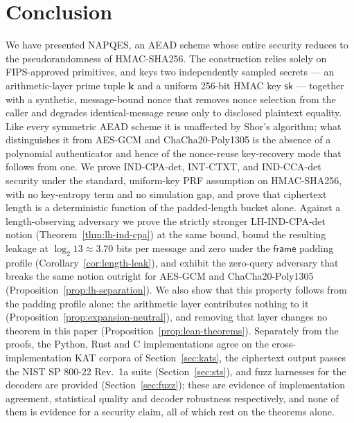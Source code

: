 \documentclass[11pt,a4paper]{article}
\begin{document}
\section{Conclusion}
\label{sec:conclusion}

We have presented NAPQES, an AEAD scheme whose entire security reduces to
the pseudorandomness of HMAC-SHA256. The construction relies solely on
FIPS-approved primitives, and keys two independently sampled secrets — an
arithmetic-layer prime tuple $\mathbf{k}$ and a uniform 256-bit HMAC key
$\mathsf{sk}$ — together with a synthetic, message-bound nonce that removes
nonce selection from the caller and degrades identical-message reuse only
to disclosed plaintext equality. Like every symmetric AEAD scheme it is
unaffected by Shor's algorithm; what distinguishes it from AES-GCM and
ChaCha20-Poly1305 is the absence of a polynomial authenticator and hence of
the nonce-reuse key-recovery mode that follows from one. We prove
IND-CPA-det, INT-CTXT, and IND-CCA-det security under the standard,
uniform-key PRF assumption on HMAC-SHA256, with no key-entropy term and no
simulation gap, and prove that ciphertext length is a deterministic
function of the padded-length bucket alone. Against a length-observing
adversary we prove the strictly stronger LH-IND-CPA-det notion
(Theorem~\ref{thm:lh-ind-cpa}) at the same bound, bound the resulting
leakage at $\log_2 13\approx3.70$ bits per message and zero under the
$\mathsf{frame}$ padding profile (Corollary~\ref{cor:length-leak}), and
exhibit the zero-query adversary that breaks the same notion outright for
AES-GCM and ChaCha20-Poly1305
(Proposition~\ref{prop:lh-separation}). We also show that this property
follows from the padding profile alone: the arithmetic layer contributes
nothing to it (Proposition~\ref{prop:expansion-neutral}), and removing that
layer changes no theorem in this paper
(Proposition~\ref{prop:lean-theorems}). Separately from the proofs, the
Python, Rust and C implementations agree on the cross-implementation KAT
corpora of Section~\ref{sec:kats}, the ciphertext output passes the NIST SP 800-22
Rev.\ 1a suite (Section~\ref{sec:sts}), and fuzz harnesses for the
decoders are provided (Section~\ref{sec:fuzz}); these are evidence of
implementation agreement, statistical quality and decoder robustness
respectively, and
none of them is evidence for a security claim, all of which rest on the
theorems alone.
\end{document}
